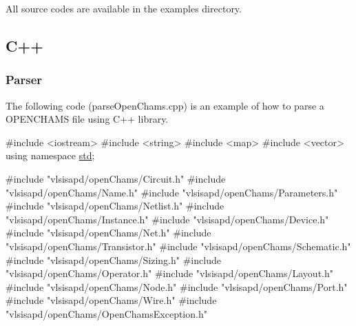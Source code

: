 All source codes are available in the {\ttfamily examples} directory.\hypertarget{openchams_openChamsC}{}\subsection{C++}\label{openchams_openChamsC}
\hypertarget{openchams_openChamsParseC}{}\subsubsection{Parser}\label{openchams_openChamsParseC}
The following code ({\ttfamily parse\+Open\+Chams.\+cpp}) is an example of how to parse a O\+P\+E\+N\+C\+H\+A\+MS file using C++ library. 
\begin{DoxyCodeInclude}
\textcolor{preprocessor}{#include <iostream>}
\textcolor{preprocessor}{#include <string>}
\textcolor{preprocessor}{#include <map>}
\textcolor{preprocessor}{#include <vector>}
\textcolor{keyword}{using namespace }\hyperlink{namespacestd}{std};

\textcolor{preprocessor}{#include "vlsisapd/openChams/Circuit.h"}
\textcolor{preprocessor}{#include "vlsisapd/openChams/Name.h"}
\textcolor{preprocessor}{#include "vlsisapd/openChams/Parameters.h"}
\textcolor{preprocessor}{#include "vlsisapd/openChams/Netlist.h"}
\textcolor{preprocessor}{#include "vlsisapd/openChams/Instance.h"}
\textcolor{preprocessor}{#include "vlsisapd/openChams/Device.h"}
\textcolor{preprocessor}{#include "vlsisapd/openChams/Net.h"}
\textcolor{preprocessor}{#include "vlsisapd/openChams/Transistor.h"}
\textcolor{preprocessor}{#include "vlsisapd/openChams/Schematic.h"}
\textcolor{preprocessor}{#include "vlsisapd/openChams/Sizing.h"}
\textcolor{preprocessor}{#include "vlsisapd/openChams/Operator.h"}
\textcolor{preprocessor}{#include "vlsisapd/openChams/Layout.h"}
\textcolor{preprocessor}{#include "vlsisapd/openChams/Node.h"}
\textcolor{preprocessor}{#include "vlsisapd/openChams/Port.h"}
\textcolor{preprocessor}{#include "vlsisapd/openChams/Wire.h"}
\textcolor{preprocessor}{#include "vlsisapd/openChams/OpenChamsException.h"}


\end{DoxyCodeInclude}
